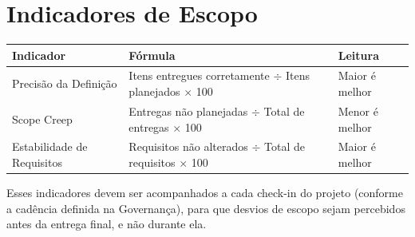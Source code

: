 \documentclass[11pt,a4paper]{article}
\begin{document}
\section{Indicadores de Escopo}
\begin{center}
\begin{tabularx}{\textwidth}{L l l}
\toprule
\textbf{Indicador} & \textbf{Fórmula} & \textbf{Leitura} \\
\midrule
Precisão da Definição & Itens entregues corretamente $\div$ Itens planejados $\times$ 100 & Maior é melhor \\
Scope Creep & Entregas não planejadas $\div$ Total de entregas $\times$ 100 & Menor é melhor \\
Estabilidade de Requisitos & Requisitos não alterados $\div$ Total de requisitos $\times$ 100 & Maior é melhor \\
\bottomrule
\end{tabularx}
\end{center}

\noindent Esses indicadores devem ser acompanhados a cada check-in do projeto (conforme a cadência definida na Governança), para que desvios de escopo sejam percebidos antes da entrega final, e não durante ela.
\end{document}
